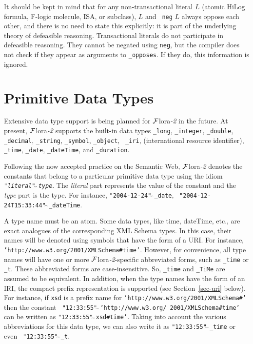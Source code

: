 \documentclass[11pt]{article}
\newcommand{\FLORA}{{\mbox{\sc ${\cal F}${lora}\rm\emph{-2}}}\xspace}
\begin{document}
It should be kept in mind that for any non-transactional literal $L$
(atomic HiLog formula, F-logic molecule, ISA, or subclass), $L$ and {\tt
  neg} $L$ always oppose each other, and there is no need to state this
explicitly: it is part of the underlying theory of defeasible reasoning.
Transactional literals do not participate in defeasible reasoning.
They cannot be negated using {\tt neg}, but the compiler does not check if
they appear as arguments to {\tt \_opposes}. If they do, this information
is ignored. 


\section{Primitive Data Types}\label{sec-data-types}

Extensive data type support is being planned for \FLORA in the future.
At present, \FLORA supports the built-in data types
{\tt \_long}, \texttt{\_integer},
{\tt \_double},  \texttt{\_decimal},
\texttt{\_string}, {\tt \_symbol}, {\tt \_object}, {\tt
  \_iri}, (international resource identifier), {\tt \_time}, {\tt \_date},
{\tt \_dateTime}, and {\tt \_duration}.

Following the now accepted practice on the Semantic Web, \FLORA denotes the
constants that belong to a particular primitive data type using the idiom
{\tt "\emph{literal}"$\hat{~}\hat{~}$\emph{type}}. The \emph{literal} part
represents the value of the constant and the \emph{type} part is the
type. For instance, {\tt "2004-12-24"$\hat{~}\hat{~}$\_date}, {\tt
  "2004-12-24T15:33:44"$\hat{~}\hat{~}$\_dateTime}.

A type name must be an atom.
Some data types, like time, dateTime, etc., are exact analogues of the
corresponding XML Schema types. In this case, their names will be denoted
using symbols that have the form of a URI. For instance,
{\tt 'http://www.w3.org/2001/XMLSchema\#time'}.  However, for convenience,
all type names will have one or more \FLORA-specific abbreviated forms, such as
{\tt \_time} or {\tt \_t}. These abbreviated forms are
case-insensitive. So, {\tt \_time} and
{\tt \_TiMe} are assumed to be equivalent. In addition, when the type names have
the form of an IRI, the compact prefix representation is supported (see
Section~\ref{sec-uri} below). For
instance, if {\tt xsd}  is a prefix name for
{\tt 'http://www.w3.org/2001/XMLSchema\#'} 
then the constant {\tt
  "12:33:55"$\hat{~}\hat{~}$'http://www.w3.org/ 2001/XMLSchema\#time'}  can be written as
{\tt "12:33:55"$\hat{~}\hat{~}$xsd\#time'}. Taking into account the
various abbreviations for this data type, we can also write it as
{\tt "12:33:55"$\hat{~}\hat{~}$\_time} or even {\tt
  "12:33:55"$\hat{~}\hat{~}$\_t}.
\end{document}
